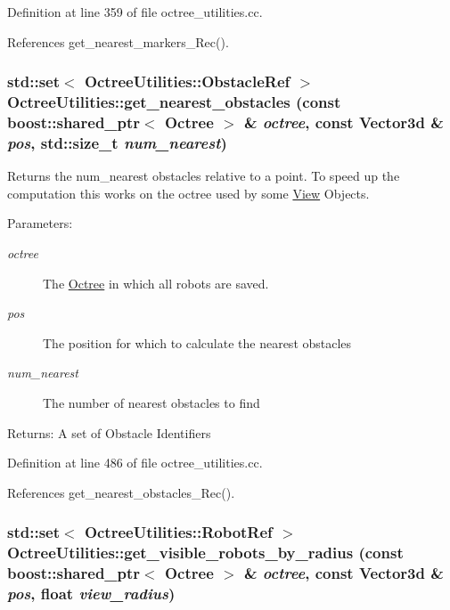 Definition at line 359 of file octree\_\-utilities.cc.

References get\_\-nearest\_\-markers\_\-Rec().\hypertarget{class_octree_utilities_45cebd25791115e73902559da1d3b5b7}{
\subsubsection[get\_\-nearest\_\-obstacles]{\setlength{\rightskip}{0pt plus 5cm}std::set$<$ OctreeUtilities::ObstacleRef $>$ OctreeUtilities::get\_\-nearest\_\-obstacles (const boost::shared\_\-ptr$<$ {\bf Octree} $>$ \& {\em octree}, \/  const Vector3d \& {\em pos}, \/  std::size\_\-t {\em num\_\-nearest})}}
\label{class_octree_utilities_45cebd25791115e73902559da1d3b5b7}


Returns the num\_\-nearest obstacles relative to a point. To speed up the computation this works on the octree used by some \hyperlink{class_view}{View} Objects.

\begin{Desc}
\item[Parameters:]
\begin{description}
\item[{\em octree}]The \hyperlink{class_octree}{Octree} in which all robots are saved. \item[{\em pos}]The position for which to calculate the nearest obstacles \item[{\em num\_\-nearest}]The number of nearest obstacles to find\end{description}
\end{Desc}
\begin{Desc}
\item[Returns:]A set of Obstacle Identifiers \end{Desc}


Definition at line 486 of file octree\_\-utilities.cc.

References get\_\-nearest\_\-obstacles\_\-Rec().\hypertarget{class_octree_utilities_05c722135a9cab040b67890ac5a1b8bd}{
\subsubsection[get\_\-visible\_\-robots\_\-by\_\-radius]{\setlength{\rightskip}{0pt plus 5cm}std::set$<$ OctreeUtilities::RobotRef $>$ OctreeUtilities::get\_\-visible\_\-robots\_\-by\_\-radius (const boost::shared\_\-ptr$<$ {\bf Octree} $>$ \& {\em octree}, \/  const Vector3d \& {\em pos}, \/  float {\em view\_\-radius})}}
\label{class_octree_utilities_05c722135a9cab040b67890ac5a1b8bd}


